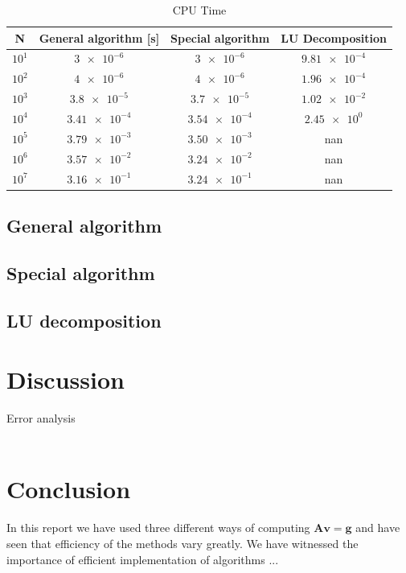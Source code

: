 \documentclass[american,a4paper,12pt]{article}
\renewcommand{\vec}[1]{\mathbf{#1}} %
\begin{document}
  \begin{table}[H]
    \begin{center}
    \caption{CPU Time}
    \begin{tabular}{|c|c|c|c|} \hline
    \textbf{N} & \textbf{General algorithm [s]} & \textbf{Special algorithm} & \textbf{LU Decomposition} \\ \hline
    $10^1$ & $\num{3e-6}$     & $\num{3e-6}$    & $\num{9.81e-4}$ \\ \hline
    $10^2$ & $\num{4e-6}$     & $\num{4e-6}$    & $\num{1.96e-4}$ \\ \hline
    $10^3$ & $\num{3.8e-5}$   & $\num{3.7e-5}$  & $\num{1.02e-2}$ \\ \hline
    $10^4$ & $\num{3.41e-4}$  & $\num{3.54e-4}$ & $\num{2.45e0}$ \\ \hline
    $10^5$ & $\num{3.79e-3}$  & $\num{3.50e-3}$ & nan \\ \hline
    $10^6$ & $\num{3.57e-2}$  & $\num{3.24e-2}$ & nan \\ \hline
    $10^7$ & $\num{3.16e-1}$  & $\num{3.24e-1}$ & nan \\ \hline
    \end{tabular}
    \end{center}
    \label{tab:final_res}
  \end{table}

\subsection{General algorithm}

\subsection{Special algorithm}

\subsection{LU decomposition}

\section{Discussion}
Error analysis \\
\\


\section{Conclusion}
In this report we have used three different ways of computing $\vec{A}\vec{v} = \vec{g}$ and have seen that efficiency of the methods vary greatly. We have witnessed the importance of efficient implementation of algorithms ...
\end{document}
